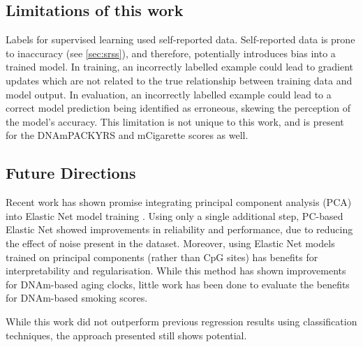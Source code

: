 \documentclass[draft]{article}
\begin{document}
\subsection{Limitations of this work} \label{sec:limitations}
Labels for supervised learning used self-reported data. Self-reported data is prone to inaccuracy (see
\ref{sec:srss}), and therefore, potentially introduces bias into a trained model. In training, an incorrectly labelled example could lead to gradient updates which are not related to the true relationship between training data and model output. In evaluation, an incorrectly labelled example could lead to a correct model prediction being identified as erroneous, skewing the perception of the model's accuracy. This limitation is not unique to this work, and is present for the DNAmPACKYRS and mCigarette scores as well.

\subsection{Future Directions}
Recent work has shown promise integrating principal component analysis (PCA) into Elastic Net model training \cite{higgins2022computational}. Using only a single additional step, PC-based Elastic Net showed improvements in reliability and performance, due to reducing the effect of noise present in the dataset. Moreover, using Elastic Net models trained on principal components (rather than CpG sites) has benefits for interpretability and regularisation. While this method has shown improvements for DNAm-based aging clocks, little work has been done to evaluate the benefits for DNAm-based smoking scores.

While this work did not outperform previous regression results using classification techniques, the approach presented still shows potential. 

\end{document}
